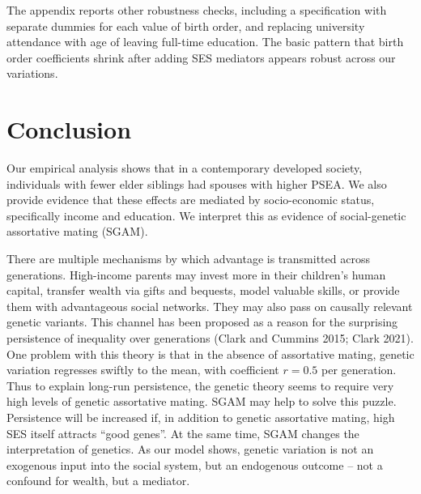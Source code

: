 \documentclass[
]{article}
\theoremstyle{definition}
\theoremstyle{definition}
\theoremstyle{definition}
\theoremstyle{definition}
\theoremstyle{remark}
\begin{document}
The appendix reports other robustness checks, including a specification with
separate dummies for each value of birth order, and replacing university
attendance with age of leaving full-time education. The basic pattern that birth
order coefficients shrink after adding SES mediators appears robust across our
variations.

\hypertarget{conclusion}{%
\section{Conclusion}\label{conclusion}}

Our empirical analysis shows that in a contemporary developed society,
individuals with fewer elder siblings had spouses with higher PSEA. We also provide
evidence that these effects are mediated by socio-economic status, specifically
income and education. We interpret this as evidence of social-genetic assortative
mating (SGAM).

There are multiple mechanisms by which advantage is transmitted across
generations. High-income parents may invest more in their children's human
capital, transfer wealth via gifts and bequests, model valuable skills, or
provide them with advantageous social networks. They may also pass on causally
relevant genetic variants. This channel has been proposed as a reason for the
surprising persistence of inequality over generations
(Clark and Cummins 2015; Clark 2021). One problem with this theory is
that in the absence of assortative mating, genetic variation regresses swiftly
to the mean, with coefficient \(r = 0.5\) per generation. Thus to explain long-run
persistence, the genetic theory seems to require very high levels of genetic
assortative mating. SGAM may help to solve this puzzle. Persistence will be
increased if, in addition to genetic assortative mating, high SES itself
attracts ``good genes''. At the same time, SGAM changes the interpretation of
genetics. As our model shows, genetic variation is not an exogenous input into
the social system, but an endogenous outcome -- not a confound for wealth, but a mediator.
\end{document}
